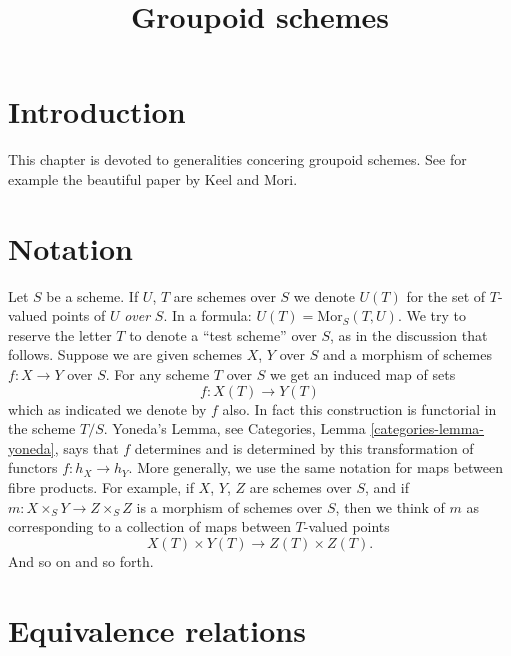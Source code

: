 

%


\title{Groupoid schemes}


\maketitle

\label{section-phantom}

\tableofcontents

\section{Introduction}
\label{section-introduction}

\noindent
This chapter is devoted to generalities concering groupoid schemes.
See for example the beautiful paper \cite{K-M} by Keel and Mori.





\section{Notation}
\label{section-notation}

\noindent
Let $S$ be a scheme. If $U$, $T$ are schemes over $S$ we denote
$U(T)$ for the set of $T$-valued points of $U$ {\it over} $S$. In a formula:
$U(T) = \text{Mor}_S(T, U)$. We try to reserve the letter $T$ to denote
a ``test scheme'' over $S$, as in the discussion that follows.
Suppose we are given schemes $X$, $Y$ over
$S$ and a morphism of schemes $f : X \to Y$ over $S$.
For any scheme $T$ over $S$ we get an induced map of sets
$$
f : X(T) \longrightarrow Y(T)
$$
which as indicated we denote by $f$ also. In fact this construction
is functorial in the scheme $T/S$. Yoneda's Lemma, see Categories,
Lemma \ref{categories-lemma-yoneda}, says that $f$ determines and is
determined by this transformation of functors $f : h_X \to h_Y$.
More generally, we use the same notation for maps between fibre
products. For example, if
$X$, $Y$, $Z$ are schemes over $S$, and if
$m : X \times_S Y \to Z \times_S Z$ is
a morphism of schemes over $S$, then we think of $m$ as corresponding
to a collection of maps between $T$-valued points
$$
X(T) \times Y(T) \longrightarrow Z(T) \times Z(T).
$$
And so on and so forth.






\section{Equivalence relations}
\label{section-equivalence-relations}

